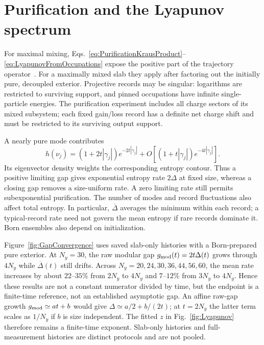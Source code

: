 \documentclass[aps,prb,10pt,twocolumn,superscriptaddress,longbibliography,floatfix]{revtex4-2}
\begin{document}
\section{Purification and the Lyapunov spectrum}
\label{app:Lyapunov}
{\color{blue}
For maximal mixing, Eqs.~\eqref{eq:PurificationKrausProduct}--\eqref{eq:LyapunovFromOccupations} expose the positive part of the trajectory operator~\cite{XiaoKawabata2026}. For a maximally mixed slab they apply after factoring out the initially pure, decoupled exterior. Projective records may be singular: logarithms are restricted to surviving support, and pinned occupations have infinite single-particle energies. The purification experiment includes all charge sectors of its mixed subsystem; each fixed gain/loss record has a definite net charge shift and must be restricted to its surviving output support.

A nearly pure mode contributes
\begin{equation}
 h(\nu_j)=(1+2t|\gamma_j|)e^{-2t|\gamma_j|}
 +O\!\left[(1+t|\gamma_j|)e^{-4t|\gamma_j|}\right].
 \label{eq:PurificationEntropyAsymptotic}
\end{equation}
Its eigenvector density weights the corresponding entropy contour. Thus a positive limiting gap gives exponential entropy rate $2\Delta$ at fixed size, whereas a closing gap removes a size-uniform rate. A zero limiting rate still permits subexponential purification. The number of modes and record fluctuations also affect total entropy. In particular, $\overline\Delta$ averages the minimum within each record; a typical-record rate need not govern the mean entropy if rare records dominate it. Born ensembles also depend on initialization.

Figure~\ref{fig:GapConvergence} uses saved slab-only histories with a Born-prepared pure exterior. At $N_y=30$, the raw modular gap $g_{\rm mod}(t)=2t\Delta(t)$ grows through $4N_y$ while $\overline\Delta(t)$ still drifts. Across $N_y=20,24,30,36,44,56,60$, the mean rate increases by about $22$--$35\%$ from $2N_y$ to $4N_y$ and $7$--$12\%$ from $3N_y$ to $4N_y$. Hence these results are not a constant numerator divided by time, but the endpoint is a finite-time reference, not an established asymptotic gap. An affine raw-gap growth $g_{\rm mod}\simeq at+b$ would give $\Delta\simeq a/2+b/(2t)$; at $t=2N_y$ the latter term scales as $1/N_y$ if $b$ is size independent. The fitted $z$ in Fig.~\ref{fig:Lyapunov} therefore remains a finite-time exponent. Slab-only histories and full-measurement histories are distinct protocols and are not pooled.
}
\end{document}
